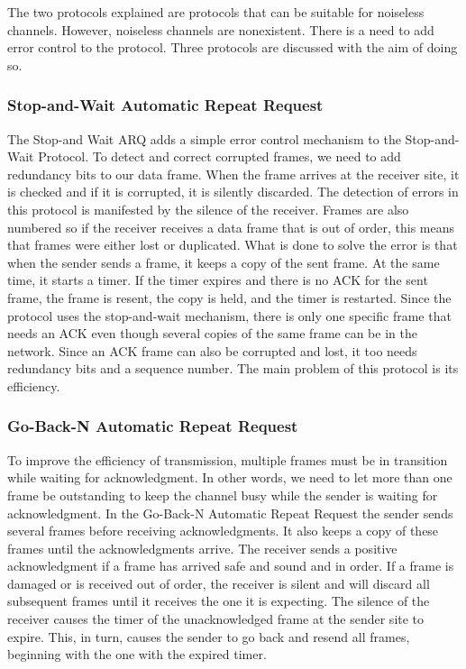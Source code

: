 The two protocols explained are protocols that can be suitable for noiseless channels. However, noiseless channels are nonexistent. There is a need to add error control to the protocol. Three protocols are discussed with the aim of doing so.
\subsubsection{Stop-and-Wait Automatic Repeat Request}
The Stop-and Wait ARQ adds a simple error control mechanism to the Stop-and-Wait Protocol. To detect and correct corrupted frames, we need to add redundancy bits to our data
frame. When the frame arrives at the receiver site, it is checked and if
it is corrupted, it is silently discarded. The detection of errors in this protocol is manifested
by the silence of the receiver. Frames are also numbered so if the
receiver receives a data frame that is out of order, this means that frames were either
lost or duplicated. What is done to solve the error is that when the sender sends a frame, it    keeps a copy of the sent frame. At the same time, it starts
a timer. If the timer expires and there is no ACK for the sent frame, the frame is resent, the
copy is held, and the timer is restarted. Since the protocol uses the stop-and-wait mechanism,
there is only one specific frame that needs an ACK even though several copies of
the same frame can be in the network. Since an ACK frame can also be corrupted and lost, it too needs redundancy bits
and a sequence number. The main problem of this protocol is its efficiency.  
\subsubsection{Go-Back-N Automatic Repeat Request}
To improve the efficiency of transmission, multiple frames must be in
transition while waiting for acknowledgment. In other words, we need to let more than
one frame be outstanding to keep the channel busy while the sender is waiting for
acknowledgment. In the Go-Back-N Automatic Repeat Request the sender sends several frames before receiving acknowledgments. It also keeps a copy of these frames until the acknowledgments
arrive. The receiver sends a positive acknowledgment if a frame has arrived safe and sound
and in order. If a frame is damaged or is received out of order, the receiver is silent and
will discard all subsequent frames until it receives the one it is expecting. The silence of
the receiver causes the timer of the unacknowledged frame at the sender site to expire.
This, in turn, causes the sender to go back and resend all frames, beginning with the one
with the expired timer.
